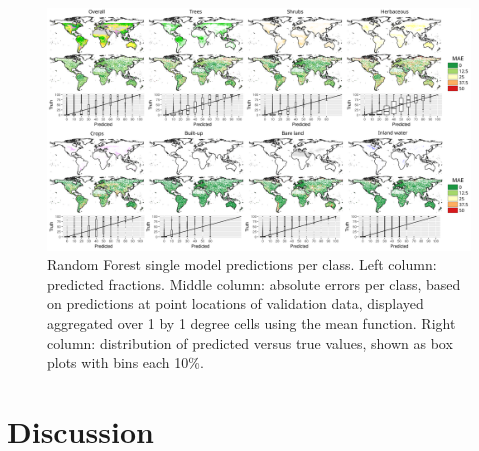 \documentclass[review,authoryear,3p]{elsarticle}
\begin{document}
\begin{figure}
    \centering
    \includegraphics[width=\textwidth]{article/article-figures/maps/2020-06-19-walltowall.png}
    \caption{Random Forest single model predictions per class. Left column: predicted fractions. Middle column: absolute errors per class, based on predictions at point locations of validation data, displayed aggregated over 1 by 1 degree cells using the mean function. Right column: distribution of predicted versus true values, shown as box plots with bins each 10\%.}
    \label{fig-walltowall}
\end{figure}

\section{Discussion}

\end{document}
